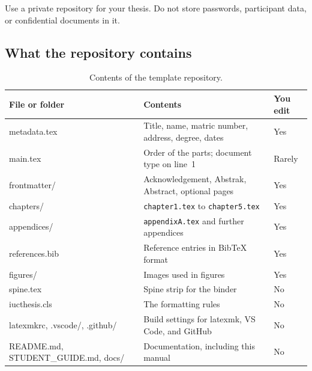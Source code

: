 \documentclass[11pt,a4paper]{article}
\newcommand\thd[1]{\bfseries #1}
\begin{document}
\begin{warnbox}
Use a private repository for your thesis. Do not store passwords, participant
data, or confidential documents in it.
\end{warnbox}

\subsection{What the repository contains}

\begin{table}[htbp]
\caption{Contents of the template repository.}
\label{tab:files}
\small
\begin{tabularx}{\textwidth}{@{}>{\ttfamily}p{46mm}X>{\centering\arraybackslash}p{15mm}@{}}
\toprule
\normalfont\thd{File or folder} & \thd{Contents} & \thd{You edit} \\
\midrule
metadata.tex          & Title, name, matric number, address, degree, dates     & Yes \\
main.tex              & Order of the parts; document type on line~1             & Rarely \\
frontmatter/          & Acknowledgement, Abstrak, Abstract, optional pages     & Yes \\
chapters/             & \texttt{chapter1.tex} to \texttt{chapter5.tex}          & Yes \\
appendices/           & \texttt{appendixA.tex} and further appendices           & Yes \\
references.bib        & Reference entries in BibTeX format                     & Yes \\
figures/              & Images used in figures                                 & Yes \\
spine.tex             & Spine strip for the binder                             & No \\
iucthesis.cls         & The formatting rules                                   & No \\
latexmkrc, .vscode/, .github/ & Build settings for latexmk, VS Code, and GitHub & No \\
README.md, STUDENT\_GUIDE.md, docs/ & Documentation, including this manual     & No \\
\bottomrule
\end{tabularx}
\end{table}
\end{document}

